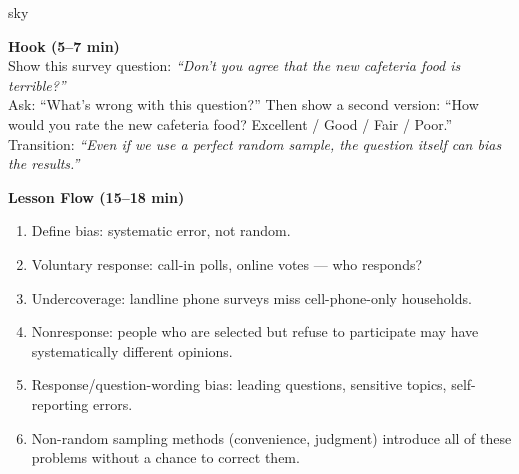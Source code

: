 \documentclass[10pt]{article}
\begin{document}
\begin{skillbox}{sky}
\begin{minipage}[t]{0.48\linewidth}
    \textbf{Hook (5--7 min)}\\
    Show this survey question: \textit{``Don't you agree that the new cafeteria food
    is terrible?''}\\[4pt]
    Ask: ``What's wrong with this question?'' Then show a second version: ``How would
    you rate the new cafeteria food? Excellent / Good / Fair / Poor.''\\[4pt]
    Transition: \textit{``Even if we use a perfect random sample, the question itself
    can bias the results.''}
\end{minipage}
\hfill
\begin{minipage}[t]{0.48\linewidth}
    \textbf{Lesson Flow (15--18 min)}
    \begin{enumerate}
        \item Define bias: systematic error, not random.
        \item Voluntary response: call-in polls, online votes --- who responds?
        \item Undercoverage: landline phone surveys miss cell-phone-only households.
        \item Nonresponse: people who are selected but refuse to participate may have
              systematically different opinions.
        \item Response/question-wording bias: leading questions, sensitive topics,
              self-reporting errors.
        \item Non-random sampling methods (convenience, judgment) introduce all of
              these problems without a chance to correct them.
    \end{enumerate}
\end{minipage}
\end{skillbox}
\end{document}

